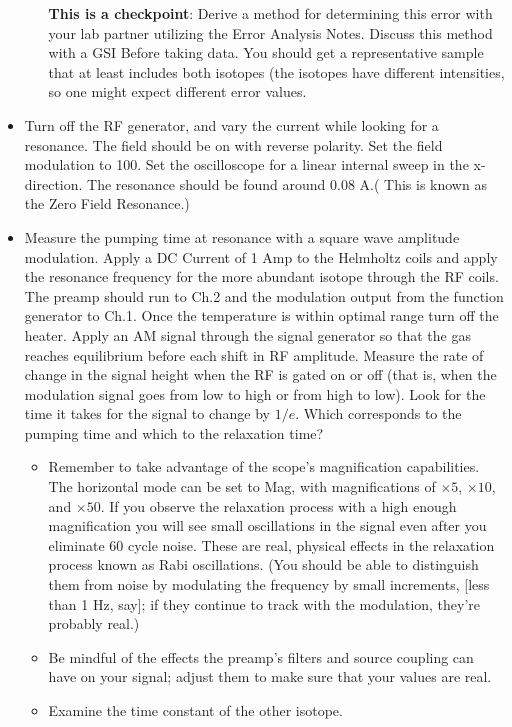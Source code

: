 \documentclass[11pt]{article}
\begin{document}
\begin{itemize}
\begin{itemize}
{		\parbox{0.97\linewidth}
		{\textbf{This is a checkpoint}: Derive a method for determining this error with your lab partner utilizing the Error Analysis Notes. Discuss this method with a GSI Before taking data.  You should get a representative sample that at least includes both isotopes (the isotopes have different intensities, so one might expect different error values.}}
	\end{itemize}
\item Turn off the RF generator, and vary the current while looking for a resonance. The field should be on with reverse polarity. Set the field modulation to 100. Set the oscilloscope for a linear internal sweep in the x-direction. The resonance should be found around 0.08 A.( This is known as the Zero Field Resonance.) 
\item Measure the pumping time at resonance with a square wave amplitude modulation. Apply a DC Current of 1 Amp to the Helmholtz coils and apply the resonance frequency for the more abundant isotope through the RF coils. The preamp should run to Ch.2 and the modulation output from the function generator to Ch.1. Once the temperature is within optimal range turn off the heater. Apply an AM signal through the signal generator so that the gas reaches equilibrium before each shift in RF amplitude. Measure the rate of change in the signal height when the RF is gated on or off (that is, when the modulation signal goes from low to high or from high to low). Look for the time it takes for the signal to change by $1/e$. Which corresponds to the pumping time and which to the relaxation time?
	\begin{itemize}
	\item Remember to take advantage of the scope's magnification capabilities. The horizontal mode can be set to Mag, with magnifications of $\times5$, $\times10$, and $\times50$. If you observe the relaxation process with a high enough magnification you will see small oscillations in the signal even after you eliminate 60 cycle noise. These are real, physical effects in the relaxation process known as Rabi oscillations. (You should be able to distinguish them from noise by modulating the frequency by small increments, [less than 1 Hz, say]; if they continue to track with the modulation, they're probably real.)
	\item Be mindful of the effects the preamp's filters and source coupling can have on your signal; adjust them to make sure that your values are real.
	\item Examine the time constant of the other isotope. 
	\end{itemize}
\end{itemize}
\end{document}
